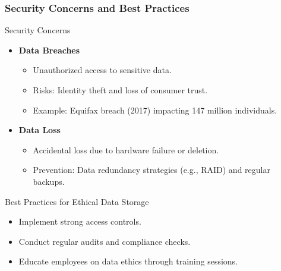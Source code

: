 \documentclass[aspectratio=169]{beamer}
\begin{document}
\begin{frame}[fragile]
    \frametitle{Security Concerns and Best Practices}
    \begin{block}{Security Concerns}
        \begin{itemize}
            \item \textbf{Data Breaches}
                \begin{itemize}
                    \item Unauthorized access to sensitive data.
                    \item Risks: Identity theft and loss of consumer trust.
                    \item Example: Equifax breach (2017) impacting 147 million individuals.
                \end{itemize}
            \item \textbf{Data Loss}
                \begin{itemize}
                    \item Accidental loss due to hardware failure or deletion.
                    \item Prevention: Data redundancy strategies (e.g., RAID) and regular backups.
                \end{itemize}
        \end{itemize}
    \end{block}
    
    \begin{block}{Best Practices for Ethical Data Storage}
        \begin{itemize}
            \item Implement strong access controls.
            \item Conduct regular audits and compliance checks.
            \item Educate employees on data ethics through training sessions.
        \end{itemize}
    \end{block}
\end{frame}
\end{document}
